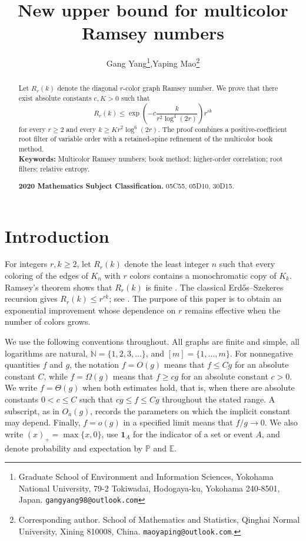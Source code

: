 \documentclass[twoside,12pt]{article}
\theoremstyle{definition}
\theoremstyle{remark}
\newcommand{\E}{\mathbb E}
\newcommand{\Pp}{\mathbb P}
\newcommand{\N}{\mathbb N}
\newcommand{\1}{\mathbf 1}
\begin{document}
\title{\textbf{New upper bound
for multicolor Ramsey numbers}}
\author{Gang Yang\footnote{Graduate School of Environment and Information Sciences, Yokohama National University, 79-2 Tokiwadai, Hodogaya-ku, Yokohama 240-8501, Japan. {\tt gangyang98@outlook.com}},\quad Yaping Mao\footnote{Corresponding author. School of Mathematics and Statistics, Qinghai Normal University, Xining 810008, China. {\tt maoyaping@outlook.com}.}
}
\date{}
\maketitle

\begin{abstract}
Let $R_r(k)$ denote the diagonal $r$-color graph Ramsey number. We prove that
there exist absolute constants $c,K>0$ such that
\[
 R_r(k)\le
 \exp\!\left(-c\frac{k}{r^2\log^4(2r)}\right)r^{rk}
\]
for every $r\ge2$ and every $k\ge Kr^2\log^6(2r)$. The proof combines a
positive-coefficient root filter of variable order with a retained-spine
refinement of the multicolor book method.\\[2mm]
\noindent\textbf{Keywords:} Multicolor Ramsey numbers; book method;
higher-order correlation; root filters; relative entropy.

\medskip
\noindent\textbf{2020 Mathematics Subject Classification.}
05C55, 05D10, 30D15.
\end{abstract}
\section{Introduction}\label{sec:introduction}

For integers $r,k\ge2$, let $R_r(k)$ denote the least integer $n$ such that
every coloring of the edges of $K_n$ with $r$ colors contains a
monochromatic copy of $K_k$. Ramsey's theorem shows that $R_r(k)$ is finite
\cite{Ramsey1930}. The classical Erd\H{o}s--Szekeres recursion gives
$ R_r(k)\le r^{rk}$;
see \cite{ErdosSzekeres1935}. The purpose of this paper is to obtain an
exponential improvement whose dependence on $r$ remains effective when the
number of colors grows.

We use the following conventions throughout. All graphs are finite and simple,
all logarithms are natural, $\N=\{1,2,3,\ldots\}$, and
$[m]=\{1,\ldots,m\}$. For nonnegative quantities $f$ and $g$, the notation
$f=O(g)$ means that $f\le Cg$ for an absolute constant $C$, while
$f=\Omega(g)$ means that $f\ge cg$ for an absolute constant $c>0$. We write
$f=\Theta(g)$ when both estimates hold, that is, when there are absolute
constants $0<c\le C$ such that $cg\le f\le Cg$ throughout the stated range.
A subscript, as in $O_a(g)$, records the parameters on which the implicit
constant may depend. Finally, $f=o(g)$ in a specified limit means that
$f/g\to0$. We also write $(x)_+=\max\{x,0\}$, use $\1_A$ for the indicator
of a set or event $A$, and denote probability and expectation by $\Pp$ and
$\E$.
\end{document}
